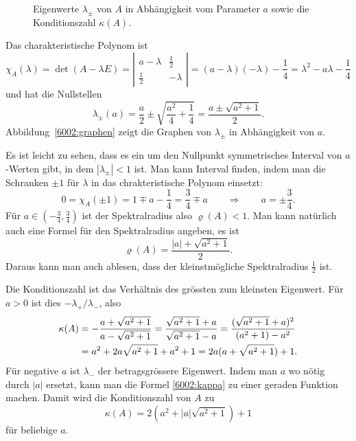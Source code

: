 \begin{loesung}
\begin{figure}
\caption{Eigenwerte $\lambda_{\pm}$ von $A$ in Abhängigkeit vom Parameter $a$
sowie die Konditionszahl $\kappa(A)$.
\label{6002:graphen}}
\end{figure}
Das charakteristische Polynom ist
\[
\chi_A(\lambda)
=
\det (A-\lambda E)
=
\left|\begin{matrix}
a-\lambda  & \frac12  \\
  \frac12  & -\lambda
\end{matrix}\right|
=
(a-\lambda)(-\lambda)-\frac14
=
\lambda^2-a\lambda-\frac14
\]
und hat die Nullstellen
\[
\lambda_{\pm}(a)
=
\frac{a}2 \pm \sqrt{\frac{a^2}4+\frac14}
=
\frac{a\pm \sqrt{a^2+1}}{2}.
\]
Abbildung~\eqref{6002:graphen} zeigt die Graphen von $\lambda_{\pm}$
in Abhängigkeit von $a$.
\begin{teilaufgaben}
\item
Es ist leicht zu sehen, dass es ein um den Nullpunkt symmetrisches
Interval von $a$-Werten gibt, in dem $|\lambda_{\pm}|<1$ ist.
Man kann Interval finden, indem man die Schranken $\pm1$ für $\lambda$
in das chrakteristische Polynom einsetzt:
\[
0=\chi_A(\pm1)
=
1\mp a-\frac14
=
\frac34
\mp a
\qquad\Rightarrow\qquad a=\pm\frac34.
\]
Für $a\in(-\frac34,\frac34)$ ist der Spektralradius also $\varrho(A)<1$.
Man kann natürlich auch eine Formel für den Spektralradius angeben, es
ist
\[
\varrho(A)
=
\frac{|a|+\sqrt{a^2 + 1}}2.
\]
Daraus kann man auch ablesen, dass der kleinstmögliche Spektralradius $\frac12$
ist.
\item
Die Konditionszahl ist das Verhältnis des grössten zum kleinsten Eigenwert.
Für $a>0$ ist dies $-\lambda_+/\lambda_-$, also
\begin{align}
\kappa(A)
&=
-\frac{a+\sqrt{a^2+1}}{a-\sqrt{a^2+1}}
=
\frac{\sqrt{a^2+1}+a}{\sqrt{a^2+1}-a}
=
\frac{(\sqrt{a^2+1}+a)^2}{(a^2+1)-a^2}
\notag
\\
&=
a^2 + 2a\sqrt{a^2+1}+a^2+1
=
2a(a +\sqrt{a^2+1}) + 1.
\label{6002:kappa}
\end{align}
Für negative $a$ ist $\lambda_-$ der betragsgrössere Eigenwert.
Indem man $a$ wo nötig durch $|a|$ ersetzt, kann man die Formel
\eqref{6002:kappa} zu einer geraden Funktion machen.
Damit wird die Konditionszahl von $A$ zu
\[
\kappa(A)
=
2(a^2 +|a|\sqrt{a^2+1}) + 1
\]
für beliebige $a$.
\qedhere
\end{teilaufgaben}
\end{loesung}

